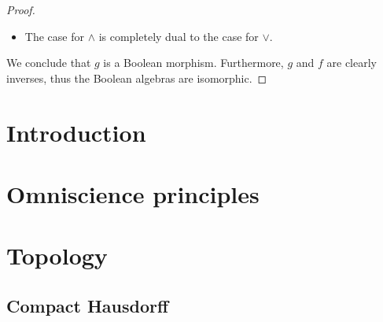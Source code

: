 \documentclass{../util/zariski-small}
\begin{document}
\begin{example}
\begin{proof}
\begin{itemize}
\begin{itemize}
%
%
      \end{itemize}
    \item The case for $\wedge$ is completely dual to the case for $\vee$. 
  \end{itemize}
We conclude that $g$ is a Boolean morphism. 
Furthermore, $g$ and $f$ are clearly inverses, thus the Boolean algebras are isomorphic. 
\end{proof}

\end{example}




%



\appendix
{}
\section*{Introduction}

%

\section{Omniscience principles}


\section{Topology}

\subsection{Compact Hausdorff}


\end{document}
